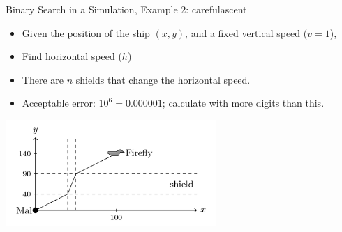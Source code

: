 \begin{frame}{Binary Search in a Simulation, Example 2: carefulascent}
  \begin{itemize}
    \item Given the position of the ship $(x,y)$, and a fixed vertical speed ($v = 1$),
    \item Find horizontal speed ($h$)
    \item There are $n$ shields that change the horizontal speed.
    \item Acceptable error: $10^6 = 0.000001$; calculate with more digits than this.
  \end{itemize}
  \begin{center}
    \includegraphics[width=0.6\textwidth]{img/carefulascent.png}
  \end{center}
\end{frame}
